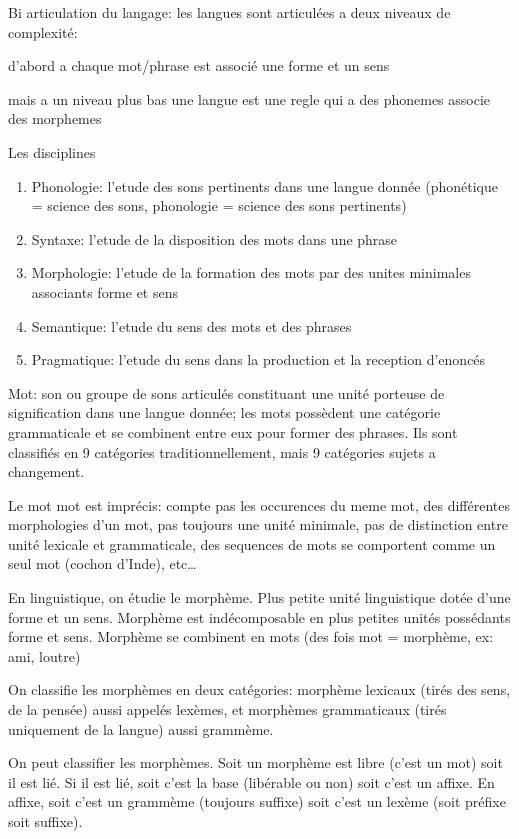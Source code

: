\documentclass[a4paper]{report}
\theoremstyle{definition}
\theoremstyle{remark}
\begin{document}
Bi articulation du langage: les langues sont articulées a deux niveaux de complexité:\par
d'abord a chaque mot/phrase est associé une forme et un sens\par
mais a un niveau plus bas une langue est une regle qui a des phonemes associe des morphemes 

Les disciplines 
\begin{enumerate}
    \item Phonologie: l'etude des sons pertinents dans une langue donnée (phonétique = science des sons, phonologie = science des sons pertinents)
    \item Syntaxe: l'etude de la disposition des mots dans une phrase
    \item Morphologie: l'etude de la formation des mots par des unites minimales associants forme et sens
    \item Semantique: l'etude du sens des mots et des phrases
    \item Pragmatique: l'etude du sens dans la production et la reception d'enoncés
\end{enumerate}

Mot: son ou groupe de sons articulés constituant une unité porteuse de signification dans une langue donnée; les mots possèdent une catégorie grammaticale et se combinent entre eux pour former des phrases. Ils sont classifiés en 9 catégories traditionnellement, mais 9 catégories sujets a changement. \par 

Le mot mot est imprécis: compte pas les occurences du meme mot, des différentes morphologies d'un mot, pas toujours une unité minimale, pas de distinction entre unité lexicale et grammaticale, des sequences de mots se comportent comme un seul mot (cochon d'Inde), etc\dots \par

En linguistique, on étudie le morphème. Plus petite unité linguistique dotée d'une forme et un sens. Morphème est indécomposable en plus petites unités possédants forme et sens. Morphème se combinent en mots (des fois mot = morphème, ex: ami, loutre) \par

On classifie les morphèmes en deux catégories: morphème lexicaux (tirés des sens, de la pensée) aussi appelés lexèmes, et morphèmes grammaticaux (tirés uniquement de la langue) aussi grammème. \par 

On peut classifier les morphèmes. Soit un morphème est libre (c'est un mot) soit il est lié. Si il est lié, soit c'est la base (libérable ou non) soit c'est un affixe. En affixe, soit c'est un grammème (toujours suffixe) soit c'est un lexème (soit préfixe soit suffixe). \par
\end{document}
